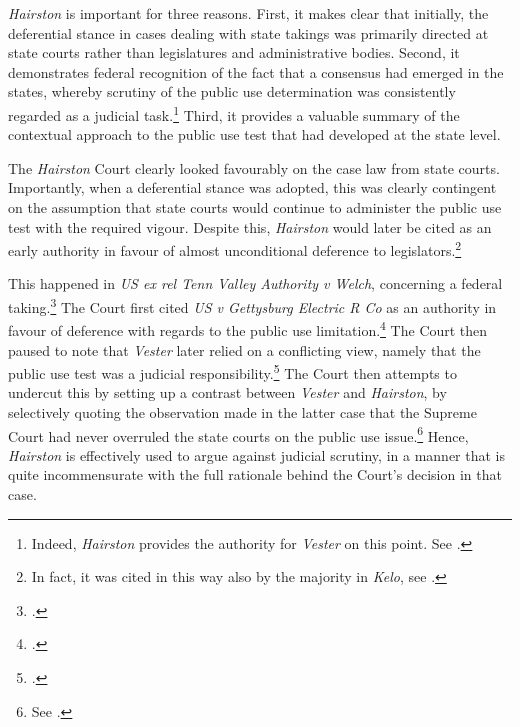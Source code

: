 {\it Hairston} is important for three reasons. First, it makes clear that initially, the deferential stance in cases dealing with state takings was primarily directed at state courts rather than legislatures and administrative bodies. Second, it demonstrates federal recognition of the fact that a consensus had emerged in the states, whereby scrutiny of the public use determination was consistently regarded as a judicial task.\footnote{Indeed, {\it Hairston} provides the authority for {\it Vester} on this point. See \cite[606]{vester30}.} Third, it provides a valuable summary of the contextual approach to the public use test that had developed at the state level. 

The {\it Hairston} Court clearly looked favourably on the case law from state courts. Importantly, when a deferential stance was adopted, this was clearly contingent on the assumption that state courts would continue to administer the public use test with the required vigour. Despite this, {\it Hairston} would later be cited as an early authority in favour of almost unconditional deference to legislators.\footnote{In fact, it was cited in this way also by the majority in {\it Kelo}, see \cite[482-483]{kelo05}.} 

This happened in {\it US ex rel Tenn Valley Authority v Welch}, concerning a federal taking.\footcite[552]{welch46} The Court first cited {\it US v Gettysburg Electric R Co} as an authority in favour of deference with regards to the public use limitation.\footcite{gettysburg96} The Court then paused to note that {\it Vester} later relied on a conflicting view, namely that the public use test was a judicial responsibility.\footcite{vester30} The Court then attempts to undercut this by setting up a contrast between {\it Vester} and {\it Hairston}, by selectively quoting the observation made in the latter case that the Supreme Court had never overruled the state courts on the public use issue.\footnote{See \cite[552]{welch46}.} Hence, {\it Hairston} is effectively used to argue against judicial scrutiny, in a manner that is quite incommensurate with the full rationale behind the Court's decision in that case.

